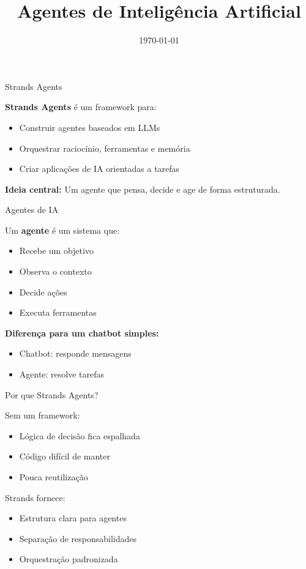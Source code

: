 \documentclass{beamer}
\title{Agentes de Inteligência Artificial}
\date{\today}
\begin{document}
    


\begin{frame}{Strands Agents}
    
    \textbf{Strands Agents} é um framework para:
    \begin{itemize}
        \item Construir agentes baseados em LLMs
        \item Orquestrar raciocínio, ferramentas e memória
        \item Criar aplicações de IA orientadas a tarefas
    \end{itemize}
    
    \vspace{0.3cm}
    
    \textbf{Ideia central:}  
    Um agente que pensa, decide e age de forma estruturada.
    
\end{frame}

\begin{frame}{Agentes de IA}
    
    Um \textbf{agente} é um sistema que:
    \begin{itemize}
        \item Recebe um objetivo
        \item Observa o contexto
        \item Decide ações
        \item Executa ferramentas
    \end{itemize}
    
    \vspace{0.3cm}
    
    \textbf{Diferença para um chatbot simples:}
    \begin{itemize}
        \item Chatbot: responde mensagens
        \item Agente: resolve tarefas
    \end{itemize}
    
\end{frame}

\begin{frame}{Por que Strands Agents?}
    
    Sem um framework:
    \begin{itemize}
        \item Lógica de decisão fica espalhada
        \item Código difícil de manter
        \item Pouca reutilização
    \end{itemize}
    
    \vspace{0.3cm}
    
    Strands fornece:
    \begin{itemize}
        \item Estrutura clara para agentes
        \item Separação de responsabilidades
        \item Orquestração padronizada
    \end{itemize}
    
\end{frame}
\end{document}
